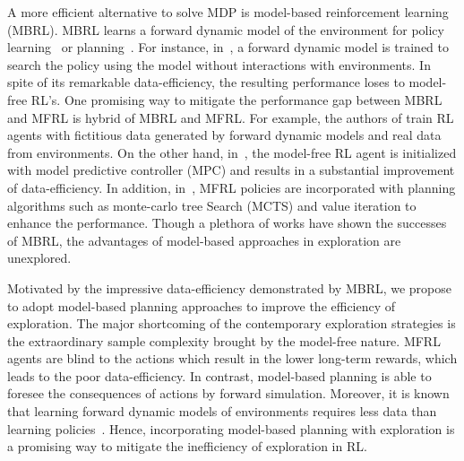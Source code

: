 \documentclass{article} %
\begin{document}
A more efficient alternative to solve MDP is model-based reinforcement learning (MBRL). MBRL learns a forward dynamic model of the environment for policy learning~\cite{deisenroth2011pilco} or planning~\cite{kamthe2018gpmpc}. For instance, in~\cite{deisenroth2011pilco}, a forward dynamic model is trained to search the policy using the model without interactions with environments. In spite of its remarkable data-efficiency, the resulting performance loses to model-free RL's. One promising way to mitigate the performance gap between MBRL and MFRL is hybrid of MBRL and MFRL. For example, the authors of \cite{sutton2012dyna, kurutach2018modelensemble} train RL agents with fictitious data generated by forward dynamic models and real data from environments. On the other hand, in~\cite{nagabandi2017neural}, the model-free RL agent is initialized with model predictive controller (MPC) and results in a substantial improvement of data-efficiency.
In addition, in~\cite{silver2016mastering,tamar2016value}, MFRL policies are incorporated with planning algorithms such as monte-carlo tree Search (MCTS) and value iteration to enhance the performance.
Though a plethora of works have shown the successes of MBRL, the advantages of model-based approaches in exploration are unexplored.

Motivated by the impressive data-efficiency demonstrated by MBRL, we propose to adopt model-based planning approaches to improve the efficiency of exploration. The major shortcoming of the contemporary exploration strategies is the extraordinary sample complexity brought by the model-free nature. MFRL agents are blind to the actions which result in the lower long-term rewards, which leads to the poor data-efficiency. In contrast, model-based planning is able to foresee the consequences of actions by forward simulation. Moreover, it is known that learning forward dynamic models of environments requires less data than learning policies~\cite{nagabandi2017neural}.  Hence, incorporating model-based planning with exploration is a promising way to mitigate the inefficiency of exploration in RL.
\end{document}
